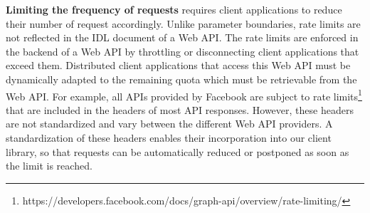 \textbf{Limiting the frequency of requests} requires client applications to reduce their number of request accordingly. Unlike parameter boundaries, rate limits are not reflected in the IDL document of a Web API. The rate limits are enforced in the backend of a Web API by throttling or disconnecting client applications that exceed them. Distributed client applications that access this Web API must be dynamically adapted to the remaining quota which must be retrievable from the Web API. For example, all APIs provided by Facebook are subject to rate limits\footnote{https://developers.facebook.com/docs/graph-api/overview/rate-limiting/} that are included in the headers of most API responses. However, these headers are not standardized and vary between the different Web API providers. A standardization of these headers enables their incorporation into our client library, so that requests can be automatically reduced or postponed as soon as the limit is reached.